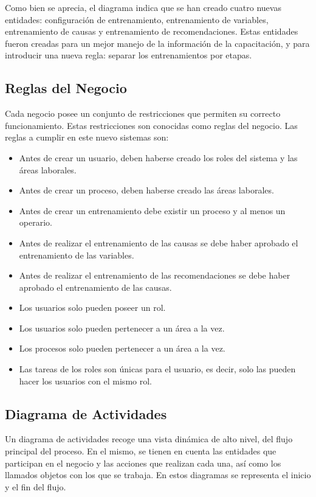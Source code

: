 Como bien se aprecia, el diagrama indica que se han creado cuatro nuevas entidades: configuración de entrenamiento, entrenamiento de variables, entrenamiento de causas y entrenamiento de recomendaciones. Estas entidades fueron creadas para un mejor manejo de la información de la capacitación, y para introducir una nueva regla: separar los entrenamientos por etapas.

\subsection{Reglas del Negocio}
Cada negocio posee un conjunto de restricciones que permiten su correcto funcionamiento. Estas restricciones son conocidas como reglas del negocio.
Las reglas a cumplir en este nuevo sistemas son:

\begin{itemize}
\item Antes de crear un usuario, deben haberse creado los roles del sistema y las áreas laborales.
\item Antes de crear un proceso, deben haberse creado las áreas laborales.
\item Antes de crear un entrenamiento debe existir un proceso y al menos un operario.
\item Antes de realizar el entrenamiento de las causas se debe haber aprobado el entrenamiento de las variables.
\item Antes de realizar el entrenamiento de las recomendaciones se debe haber aprobado el entrenamiento de las causas.
\item Los usuarios solo pueden poseer un rol.
\item Los usuarios solo pueden pertenecer a un área a la vez.
\item Los procesos solo pueden pertenecer a un área a la vez.
\item Las tareas de los roles son únicas para el usuario, es decir, solo las pueden hacer los usuarios con el mismo rol.
\end{itemize} 

\subsection{Diagrama de Actividades}
Un diagrama de actividades recoge una vista dinámica de alto nivel, del flujo principal del proceso. En el mismo, se tienen en cuenta las entidades que participan en el negocio y las acciones que realizan cada una, así como los llamados objetos con los que se trabaja. En estos diagramas se representa el inicio y el fin del flujo.

